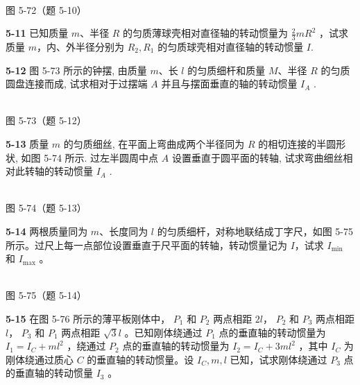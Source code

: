 \begin{center}
\resizebox{0.21\textwidth}{!}{}\\[4pt]
{\small 图 5-72（题 5-10）}
\end{center}

\newpage

\textbf{5-11} 已知质量 $m$、半径 $R$ 的匀质薄球壳相对直径轴的转动惯量为 $\frac{2}{3}mR^{2}$ ，试求质量 $m$，内、外半径分别为 $R_{2}, R_{1}$ 的匀质球壳相对直径轴的转动惯量 $I$.

\newpage

\textbf{5-12} 图 5-73 所示的钟摆, 由质量 $m$、长 $l$ 的匀质细杆和质量 $M$、半径 $R$ 的匀质圆盘连接而成, 试求相对于过摆端 $A$ 并且与摆面垂直的轴的转动惯量 $I_{A}$ .

\begin{center}
\resizebox{0.23\textwidth}{!}{}\\[4pt]
{\small 图 5-73（题 5-12）}
\end{center}

\newpage

\textbf{5-13} 质量 $m$ 的匀质细丝, 在平面上弯曲成两个半径同为 $R$ 的相切连接的半圆形状, 如图 5-74 所示. 过左半圆周中点 $A$ 设置垂直于圆平面的转轴, 试求弯曲细丝相对此转轴的转动惯量 $I_{A}$ .

\begin{center}
\resizebox{0.50\textwidth}{!}{}\\[4pt]
{\small 图 5-74（题 5-13）}
\end{center}

\newpage

\textbf{5-14} 两根质量同为 $m$、长度同为 $l$ 的匀质细杆，对称地联结成丁字尺，如图 5-75 所示。过尺上每一点部位设置垂直于尺平面的转轴，转动惯量记为 $I$，试求 $I_{\min}$ 和 $I_{\max}$ 。

\begin{center}
\resizebox{0.25\textwidth}{!}{}\\[4pt]
{\small 图 5-75（题 5-14）}
\end{center}

\newpage

\textbf{5-15} 在图 5-76 所示的薄平板刚体中， $P_{1}$ 和 $P_{2}$ 两点相距 $2l$， $P_{2}$ 和 $P_{3}$ 两点相距 $l$， $P_{3}$ 和 $P_{1}$ 两点相距 $\sqrt{3}l$ 。已知刚体绕通过 $P_{1}$ 点的垂直轴的转动惯量为 $I_{1}=I_{C}+ml^{2}$ ，绕通过 $P_{2}$ 点的垂直轴的转动惯量为 $I_{2}=I_{C}+3ml^{2}$ ，其中 $I_{C}$ 为刚体绕通过质心 $C$ 的垂直轴的转动惯量。设 $I_{C}, m, l$ 已知，试求刚体绕通过 $P_{3}$ 点的垂直轴的转动惯量 $I_{3}$ 。

